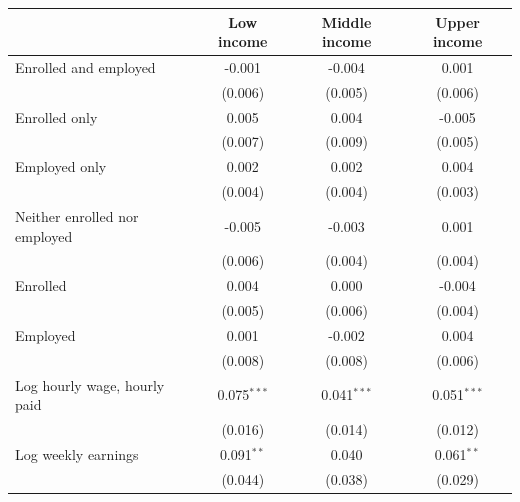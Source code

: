 \begin{tabular}{lccc}
\toprule
 & Low income & Middle income & Upper income \\
\midrule
Enrolled and employed & -0.001 & -0.004 & 0.001 \\
 & (0.006) & (0.005) & (0.006) \\
Enrolled only & 0.005 & 0.004 & -0.005 \\
 & (0.007) & (0.009) & (0.005) \\
Employed only & 0.002 & 0.002 & 0.004 \\
 & (0.004) & (0.004) & (0.003) \\
Neither enrolled nor employed & -0.005 & -0.003 & 0.001 \\
 & (0.006) & (0.004) & (0.004) \\
Enrolled & 0.004 & 0.000 & -0.004 \\
 & (0.005) & (0.006) & (0.004) \\
Employed & 0.001 & -0.002 & 0.004 \\
 & (0.008) & (0.008) & (0.006) \\
Log hourly wage, hourly paid & 0.075$^{***}$ & 0.041$^{***}$ & 0.051$^{***}$ \\
 & (0.016) & (0.014) & (0.012) \\
Log weekly earnings & 0.091$^{**}$ & 0.040 & 0.061$^{**}$ \\
 & (0.044) & (0.038) & (0.029) \\
\bottomrule
\end{tabular}
